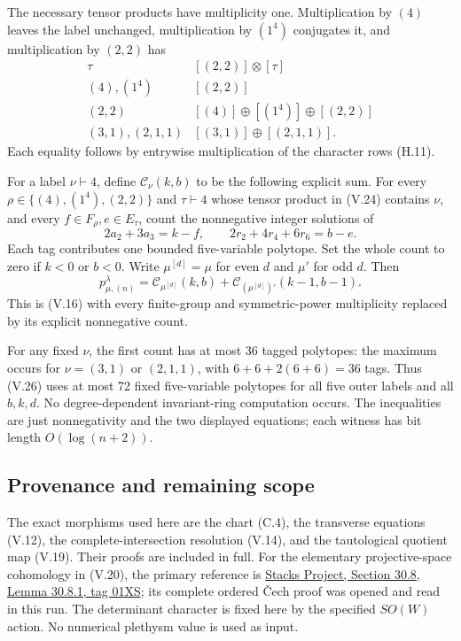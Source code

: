 \documentclass[
  10pt,
]{article}
\begin{document}
The necessary tensor products have multiplicity one. Multiplication by
\((4)\) leaves the label unchanged, multiplication by \((1^4)\)
conjugates it, and multiplication by \((2,2)\) has \[
\begin{array}{c|c}
\tau&[(2,2)]\otimes[\tau]\\ \hline
(4),(1^4)&[(2,2)]\\
(2,2)&[(4)]\oplus[(1^4)]\oplus[(2,2)]\\
(3,1),(2,1,1)&[(3,1)]\oplus[(2,1,1)].
\end{array}
\tag{V.24}
\] Each equality follows by entrywise multiplication of the character
rows (H.11).

For a label \(\nu\vdash4\), define \(\mathcal C_\nu(k,b)\) to be the
following explicit sum. For every \(\rho\in\{(4),(1^4),(2,2)\}\) and
\(\tau\vdash4\) whose tensor product in (V.24) contains \(\nu\), and
every \(f\in F_\rho,e\in E_\tau\), count the nonnegative integer
solutions of \[
2a_2+3a_3=k-f,\qquad
2r_2+4r_4+6r_6=b-e.
\tag{V.25}
\] Each tag contributes one bounded five-variable polytope. Set the
whole count to zero if \(k<0\) or \(b<0\). Write \(\mu^{[d]}=\mu\) for
even \(d\) and \(\mu'\) for odd \(d\). Then \[
\boxed{
p_{\mu,(n)}^\lambda
=\mathcal C_{\mu^{[d]}}(k,b)
+\mathcal C_{(\mu^{[d]})'}(k-1,b-1).}
\tag{V.26}
\] This is (V.16) with every finite-group and symmetric-power
multiplicity replaced by its explicit nonnegative count.

For any fixed \(\nu\), the first count has at most 36 tagged polytopes:
the maximum occurs for \(\nu=(3,1)\) or \((2,1,1)\), with
\(6+6+2(6+6)=36\) tags. Thus (V.26) uses at most 72 fixed five-variable
polytopes for all five outer labels and all \(b,k,d\). No
degree-dependent invariant-ring computation occurs. The inequalities are
just nonnegativity and the two displayed equations; each witness has bit
length \(O(\log(n+2))\).

\subsection{Provenance and remaining
scope}\label{provenance-and-remaining-scope}

The exact morphisms used here are the chart (C.4), the transverse
equations (V.12), the complete-intersection resolution (V.14), and the
tautological quotient map (V.19). Their proofs are included in full. For
the elementary projective-space cohomology in (V.20), the primary
reference is \href{https://stacks.math.columbia.edu/tag/01XS}{Stacks
Project, Section 30.8, Lemma 30.8.1, tag 01XS}; its complete ordered
Čech proof was opened and read in this run. The determinant character is
fixed here by the specified \(SO(W)\) action. No numerical plethysm
value is used as input.
\end{document}

